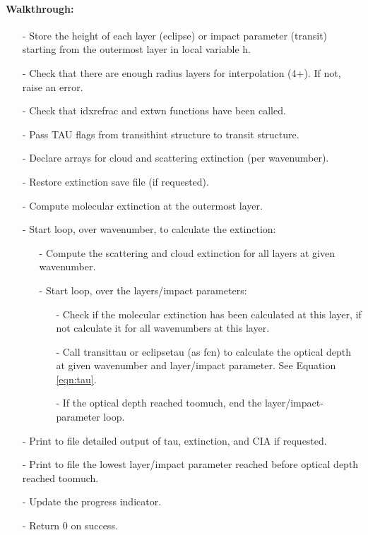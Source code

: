 \documentclass[letterpaper,12pt]{article}
\begin{document}
\paragraph{Walkthrough:}
\begin{enumerate}[leftmargin=10pt, noitemsep, parsep=0pt, topsep=0ex]
\item[-] Store the height of each layer (eclipse) or impact parameter (transit)
     starting from the outermost layer in local variable h.
\item[-] Check that there are enough radius layers for interpolation (4+).  If not, raise an error.
\item[-] Check that idxrefrac and extwn functions have been called.
\item[-] Pass TAU flags from transithint structure to transit structure.
\item[-] Declare arrays for cloud and scattering extinction (per wavenumber).
\item[-] Restore extinction save file (if requested).
\item[-] Compute molecular extinction at the outermost layer.
\item[-] Start loop, over wavenumber, to calculate the extinction:
\begin{enumerate}[leftmargin=10pt, noitemsep, parsep=0pt, topsep=0ex]
  \item[-] Compute the scattering and cloud extinction for all layers at
    given wavenumber.
  \item[-] Start loop, over the layers/impact parameters:
  \begin{enumerate}[leftmargin=10pt, noitemsep, parsep=0pt, topsep=0ex]
  \item[-] Check if the molecular extinction has been calculated at this
    layer, if not calculate it for all wavenumbers at this layer.
  \item[-] Call transittau or eclipsetau (as fcn) to calculate the
    optical depth at given wavenumber and layer/impact parameter. See Equation \ref{eqn:tau}.
  \item[-] If the optical depth reached toomuch, end the
    layer/impact-parameter loop.
  \end{enumerate}
\end{enumerate}
\item[-] Print to file detailed output of tau, extinction, and CIA if requested.
\item[-] Print to file the lowest layer/impact parameter reached before
  optical depth reached toomuch.
\item[-] Update the progress indicator.
\item[-] Return 0 on success.
\end{enumerate}
\end{document}
